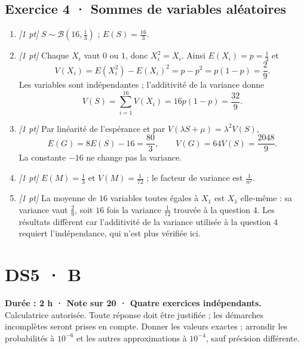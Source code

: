 \subsection*{Exercice 4 · Sommes de variables aléatoires}\begin{enumerate}

\item \textit{[1 pt]} $S\sim\mathcal B(16,\frac{1}{3})$ ; $E(S)=\frac{16}{3}$.

\item \textit{[1 pt]} Chaque $X_i$ vaut $0$ ou $1$, donc $X_i^2=X_i$. Ainsi $E(X_i)=p=\frac{1}{3}$ et
\[V(X_i)=E(X_i^2)-E(X_i)^2=p-p^2=p(1-p)=\frac{2}{9}.\]
Les variables sont indépendantes ; l'additivité de la variance donne
\[V(S)=\sum_{i=1}^{16}V(X_i)=16p(1-p)=\frac{32}{9}.\]

\item \textit{[1 pt]} Par linéarité de l'espérance et par $V(\lambda S+\mu)=\lambda^2V(S)$,
\[E(G)=8E(S)-16=\frac{80}{3},\qquad V(G)=64V(S)=\frac{2048}{9}.\]
La constante $-16$ ne change pas la variance.

\item \textit{[1 pt]} $E(M)=\frac{1}{3}$ et $V(M)=\frac{1}{72}$ ; le facteur de variance est $\frac{1}{n^2}$.

\item \textit{[1 pt]} La moyenne de $16$ variables toutes égales à $X_1$ est $X_1$ elle-même : sa variance vaut $\frac{2}{9}$, soit $16$ fois la variance $\frac{1}{72}$ trouvée à la question 4. Les résultats diffèrent car l'additivité de la variance utilisée à la question 4 requiert l'indépendance, qui n'est plus vérifiée ici.

\end{enumerate}

\fi

\fi

\ifmxteacher

\mxnewpage{}\label{sujet:7-4}

\section*{DS5 · B}


\textbf{Durée : 2 h · Note sur 20 · Quatre exercices indépendants.}\\Calculatrice autorisée. Toute réponse doit être justifiée ; les démarches incomplètes seront prises en compte. Donner les valeurs exactes ; arrondir les probabilités à $10^{-6}$ et les autres approximations à $10^{-4}$, sauf précision différente.

